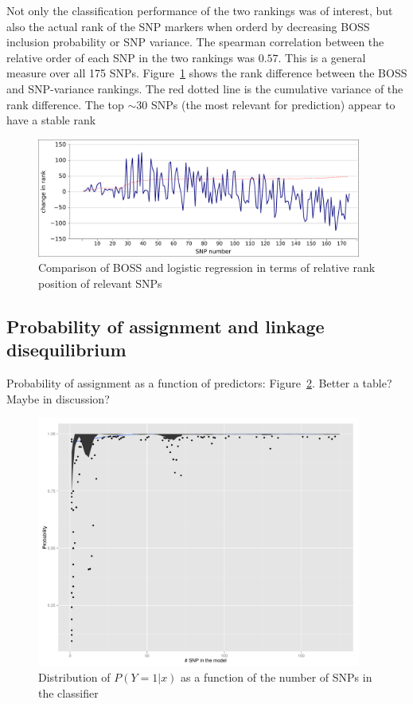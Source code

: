 Not only the classification performance of the two rankings was of
interest, but also the actual rank of the SNP markers when orderd by
decreasing BOSS inclusion probability or SNP variance. The spearman
correlation between the relative order of each SNP in the two rankings
was $0.57$. This is a general measure over all 175 SNPs.
Figure~\ref{fig:rank} shows the rank difference between the BOSS and
SNP-variance rankings. The red dotted line is the cumulative variance of
the rank difference. The top $\sim 30$ SNPs (the most relevant for
prediction) appear to have a stable rank  

\begin{figure}
\includegraphics[width=0.95\textwidth]{rank.pdf}
\caption{Comparison of BOSS and logistic regression in terms of relative
rank position of relevant SNPs}
\label{fig:rank} 
\end{figure}


\subsection{Probability of assignment and linkage disequilibrium}
Probability of assignment as a function of predictors:
Figure~\ref{fig:probability}. Better a table? Maybe in discussion?

\begin{figure}
\includegraphics[width=0.95\textwidth]{probabilities.pdf}
\caption{Distribution of $P(Y=1|x)$ as a function of the number of SNPs
  in the classifier}
\label{fig:probability} 
\end{figure}


